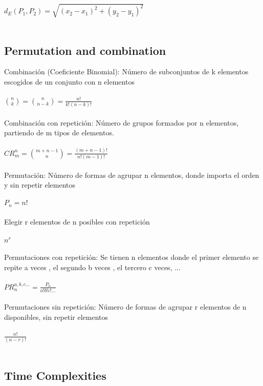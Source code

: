 \documentclass[11pt,letterpaper,twocolumn,twosided]{article}
\begin{document}
$ d_{E}(P_{1},P_{2}) = \sqrt{(x_{2}-x_{1})^{2}+(y_{2}-y_{1})^{2}} $
\\ \\



\subsection{Permutation and combination}

Combinaci\'on (Coeficiente Binomial): N\'umero de subconjuntos de k elementos escogidos de un conjunto con n elementos
\\ \\
{\LARGE $ \binom{n}{k} = \binom{n}{n-k} = \frac{n!}{k!(n-k)!} $}
\\ \\
Combinaci\'on con repetici\'on: N\'umero de grupos formados por n elementos, partiendo de m tipos de elementos.
\\ \\
{\LARGE $ CR_{m}^{n} = \binom{m+n-1}{n} = \frac{(m + n - 1)!}{n!(m-1)!} $}
\\ \\
Permutaci\'on: N\'umero de formas de agrupar n elementos, donde importa el orden y sin repetir elementos
\\ \\
{\LARGE $ P_{n} = n! $}
\\ \\
Elegir r elementos de n posibles con repetici\'on
\\ \\
{\LARGE $ n^{r} $}
\\ \\
Permutaciones con repetici\'on: Se tienen n elementos donde el primer elemento se repite a veces , el segundo b veces , el tercero c veces, ...
\\ \\
{\LARGE $ PR_{n}^{a,b,c...} = \frac{P_{n}}{a!b!c!...}$}
\\ \\
Permutaciones sin repetici\'on: N\'umero de formas de agrupar r elementos de n disponibles, sin repetir elementos 
\\ \\
{\LARGE $ \frac{n!}{(n-r)!}$}
\\ \\

\subsection{Time Complexities}
\end{document}
